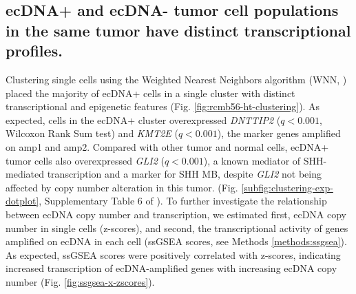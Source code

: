 \subsection{ecDNA+ and ecDNA- tumor cell populations in the same tumor have distinct transcriptional profiles.}
Clustering single cells using the Weighted Nearest Neighbors algorithm (WNN, \cite{seurat_4}) placed the majority of ecDNA+ cells in a single cluster with distinct transcriptional and epigenetic features (Fig. \ref{fig:rcmb56-ht-clustering}). As expected, cells in the ecDNA+ cluster overexpressed \textit{DNTTIP2} ($q < 0.001$, Wilcoxon Rank Sum test) and \textit{KMT2E} ($q < 0.001$), the marker genes amplified on amp1 and amp2. Compared with other tumor and normal cells, ecDNA+ tumor cells also overexpressed \textit{GLI2} ($q < 0.001$), a known mediator of SHH-mediated transcription and a marker for SHH \gls{MB}, despite \textit{GLI2} not being affected by copy number alteration in this tumor. (Fig. \ref{subfig:clustering-exp-dotplot}, Supplementary Table 6 of \cite{Chapman}). To further investigate the relationship between ecDNA copy number and transcription, we estimated first, ecDNA copy number in single cells (z-scores), and second, the transcriptional activity of genes amplified on ecDNA in each cell (ssGSEA \cite{ssGSEA_2009} scores, see Methods \ref{methods:ssgsea}). As expected, ssGSEA scores were positively correlated with z-scores, indicating increased transcription of ecDNA-amplified genes with increasing ecDNA copy number (Fig. \ref{fig:ssgsea-x-zscores}). 

